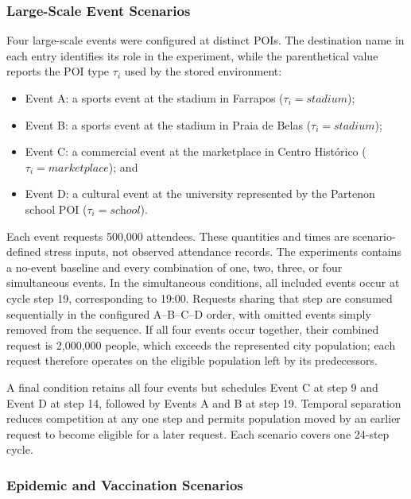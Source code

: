 \subsubsection{Large-Scale Event Scenarios}

Four large-scale events were configured at distinct POIs. The destination name in each entry identifies its role in the experiment, while the parenthetical value reports the POI type $\tau_i$ used by the stored environment:

\begin{itemize}
    \item Event A: a sports event at the stadium in Farrapos ($\tau_i=\textit{stadium}$);
    \item Event B: a sports event at the stadium in Praia de Belas ($\tau_i=\textit{stadium}$);
    \item Event C: a commercial event at the marketplace in Centro Hist\'orico ($\tau_i=\textit{marketplace}$); and
    \item Event D: a cultural event at the university represented by the Partenon school POI ($\tau_i=\textit{school}$).
\end{itemize}

Each event requests 500,000 attendees. These quantities and times are scenario-defined stress inputs, not observed attendance records. The experiments contains a no-event baseline and every combination of one, two, three, or four simultaneous events. In the simultaneous conditions, all included events occur at cycle step 19, corresponding to 19:00. Requests sharing that step are consumed sequentially in the configured A--B--C--D order, with omitted events simply removed from the sequence. If all four events occur together, their combined request is 2,000,000 people, which exceeds the represented city population; each request therefore operates on the eligible population left by its predecessors.

A final condition retains all four events but schedules Event C at step 9 and Event D at step 14, followed by Events A and B at step 19. Temporal separation reduces competition at any one step and permits population moved by an earlier request to become eligible for a later request. Each scenario covers one 24-step cycle.

\subsubsection{Epidemic and Vaccination Scenarios}

